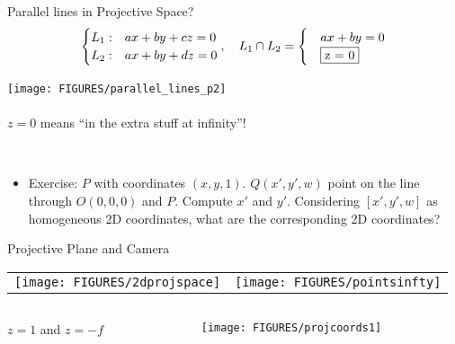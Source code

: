\documentclass[9pt]{beamer}
\begin{document}
\begin{frame}[t]{Parallel lines in Projective Space?}
  $$   \begin{cases}
      L_1: &ax + by + cz = 0\\
      L_2: &ax + by + dz = 0
    \end{cases},\quad
    L_1\cap L_2 = 
    \begin{cases}
      &ax + by = 0\\
      &\fbox{z = 0}
    \end{cases}
  $$
  \begin{center}
    \texttt{[image: FIGURES/parallel\_lines\_p2]}~\\
    ~\\
     $z=0$ means ``in the extra stuff at infinity''!
  \end{center}
 ~\\
  {\fontsize{6}{6}\selectfont
    \begin{itemize}
    \item Exercise: $P$ with coordinates $(x,y,1)$. $Q(x',y',w)$ point
      on the line through $O (0,0,0)$ and $P$.  Compute $x'$ and $y'$.
      Considering $[x',y',w]$ as homogeneous 2D coordinates, what are
      the corresponding 2D coordinates?
    \end{itemize}
  }
\end{frame}



\begin{frame}[t]{Projective Plane and Camera}
  \begin{center}
  \begin{tabular}[h]{cc}
    \texttt{[image: FIGURES/2dprojspace]} &
    \texttt{[image: FIGURES/pointsinfty]}
  \end{tabular}
  \end{center}
  \begin{columns}
    \begin{column}{0.4\textwidth}
      $z = 1$ and $z = -f$
    \end{column}
    \begin{column}{0.6\textwidth}
      \texttt{[image: FIGURES/projcoords1]}
    \end{column}
  \end{columns}
\end{frame}
\end{document}
